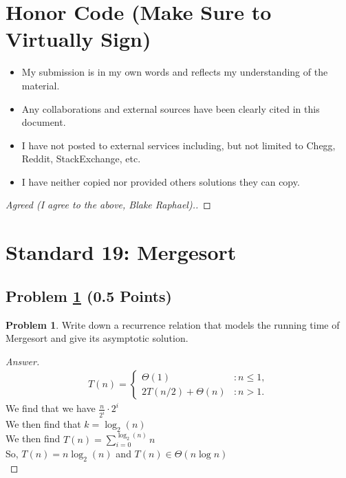 \documentclass[11pt]{article}
\theoremstyle{definition}
\theoremstyle{definition}
\newtheorem{required}{Problem}
\theoremstyle{definition}
\begin{document}
\section{Honor Code (Make Sure to Virtually Sign)} \label{HonorCode}

\begin{itemize}
\item My submission is in my own words and reflects my understanding of the material.
\item Any collaborations and external sources have been clearly cited in this document.
\item I have not posted to external services including, but not limited to Chegg, Reddit, StackExchange, etc.
\item I have neither copied nor provided others solutions they can copy.
\end{itemize}


\begin{proof}[Agreed (I agree to the above, Blake Raphael).]
\end{proof}
\newpage
\section{Standard 19: Mergesort}
\subsection{Problem \ref{mergetime} (0.5 Points)}
\begin{required}\label{mergetime}
Write down a recurrence relation that models the running time of Mergesort and give its asymptotic solution.

\begin{proof}[Answer]
\begin{align*}
T(n) = \begin{cases}
\Theta(1) & : n \leq 1, \\
2T(n/2) + \Theta(n) & : n > 1.
\end{cases}
\end{align*}
We find that we have $\frac{n}{2^i} \cdot 2^i $\\
We then find that $k = \log_2(n)$\\
We then find $T(n) = \displaystyle\sum_{i=0} ^{\log_2(n)} n$ \\
So, $T(n) = n\log_2(n)$ and $T(n) \in \Theta(n\log n)$\\


\end{proof}
\end{required}
\end{document}
